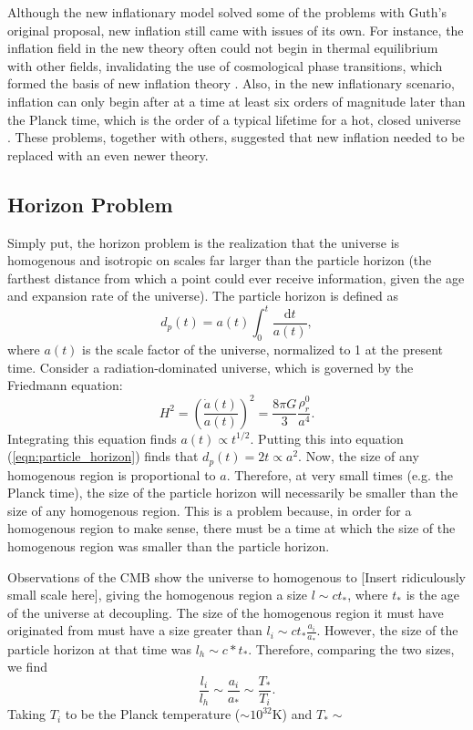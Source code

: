 \documentclass[onecolumn,apj]{emulateapj}
\def\d{\mathrm{d}}
\begin{document}
Although the new inflationary model solved some of the problems with Guth's original proposal, new inflation still came with issues of its own. For instance, the inflation field in the new theory often could not begin in thermal equilibrium with other fields, invalidating the use of cosmological phase transitions, which formed the basis of new inflation theory \citep{Linde2000}. Also, in the new inflationary scenario, inflation can only begin after at a time at least six orders of magnitude later than the Planck time, which is the order of a typical lifetime for a hot, closed universe \citep{LindeBook2005}. These problems, together with others, suggested that new inflation needed to be replaced with an even newer theory. 



\subsection{Horizon Problem}
\label{ssec:horizon}
Simply put, the horizon problem is the realization that the universe is homogenous and isotropic on scales far larger than the particle horizon (the farthest distance from which a point could ever receive information, given the age and expansion rate of the universe). The particle horizon is defined as 
\begin{equation}
d_p(t) = a(t) \int_0^t \frac{\d t}{a(t)},
\label{eqn:particle_horizon}
\end{equation}
where $a(t)$ is the scale factor of the universe, normalized to 1 at the present time. Consider a radiation-dominated universe, which is governed by the Friedmann equation:
\begin{equation}
H^2 = \left ( \frac{\dot a(t)}{a(t)} \right ) ^2 = \frac{8 \pi G}{3} \frac{\rho^0_r}{a^4}.
\end{equation}
Integrating this equation finds $a(t) \propto t^{1/2}$. Putting this into equation (\ref{eqn:particle_horizon}) finds that $d_p(t) = 2t \propto a^2$. Now, the size of any homogenous region is proportional to $a$. Therefore, at very small times (e.g. the Planck time), the size of the particle horizon will necessarily be smaller than the size of any homogenous region. This is a problem because, in order for a homogenous region to make sense, there must be a time at which the size of the homogenous region was smaller than the particle horizon. 

Observations of the CMB show the universe to homogenous to [Insert ridiculously small scale here], giving the homogenous region a size $l \sim c t_*$, where $t_*$ is the age of the universe at decoupling. The size of the homogenous region it must have originated from must have a size greater than $l_i \sim c t_* \tfrac{a_i}{a_*}$. However, the size of the particle horizon at that time was $l_h \sim c*t_*$. Therefore, comparing the two sizes, we find
\begin{equation}
\frac{l_i}{l_h} \sim \frac{a_i}{a_*} \sim \frac{T_*}{T_i}.
\end{equation}
 Taking $T_i$ to be the Planck temperature ($\sim 10^{32}$K) and $T_* \sim $
\end{document}
